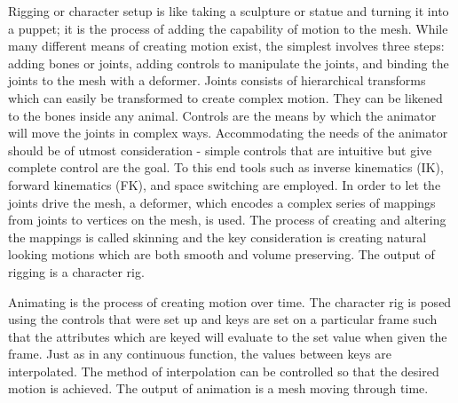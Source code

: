 Rigging or character setup is like taking a sculpture or statue and turning it into a puppet; it is the process of adding the capability of motion to the mesh. While many different means of creating motion exist, the simplest involves three steps: adding bones or joints, adding controls to manipulate the joints, and binding the joints to the mesh with a deformer. Joints consists of hierarchical transforms which can easily be transformed to create complex motion. They can be likened to the bones inside any animal. Controls are the means by which the animator will move the joints in complex ways. Accommodating the needs of the animator should be of utmost consideration - simple controls that are intuitive but give complete control are the goal. To this end tools such as inverse kinematics (IK), forward kinematics (FK), and space switching are employed. In order to let the joints drive the mesh, a deformer, which encodes a complex series of mappings from joints to vertices on the mesh, is used. The process of creating and altering the mappings is called skinning and the key consideration is creating natural looking motions which are both smooth and volume preserving. The output of rigging is a character rig.

Animating is the process of creating motion over time. The character rig is posed using the controls that were set up and keys are set on a particular frame such that the attributes which are keyed will evaluate to the set value when given the frame. Just as in any continuous function, the values between keys are interpolated. The method of interpolation can be controlled so that the desired motion is achieved. The output of animation is a mesh moving through time.

